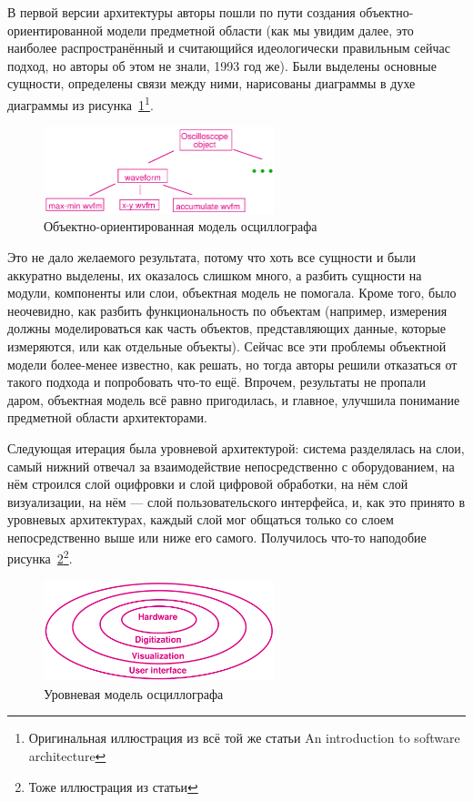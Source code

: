 \documentclass[a5paper]{article}
\begin{document}
В первой версии архитектуры авторы пошли по пути создания объектно-ориентированной модели предметной области (как мы увидим далее, это наиболее распространённый и считающийся идеологически правильным сейчас подход, но авторы об этом не знали, 1993 год же). Были выделены основные сущности, определены связи между ними, нарисованы диаграммы в духе диаграммы из рисунка~\ref{figure:oscilloscopeObjects}\footnote{Оригинальная иллюстрация из всё той же статьи An introduction to software architecture}.

\begin{figure}
	\begin{center}
		\includegraphics[width=0.6\textwidth]{oscilloscopeObjects.png}
	\end{center}
	\caption{Объектно-ориентированная модель осциллографа}
	\label{figure:oscilloscopeObjects}
\end{figure}

Это не дало желаемого результата, потому что хоть все сущности и были аккуратно выделены, их оказалось слишком много, а  разбить сущности на модули, компоненты или слои, объектная модель не помогала. Кроме того, было неочевидно, как разбить функциональность по объектам (например, измерения должны моделироваться как часть объектов, представляющих данные, которые измеряются, или как отдельные объекты). Сейчас все эти проблемы объектной модели более-менее известно, как решать, но тогда авторы решили отказаться от такого подхода и попробовать что-то ещё. Впрочем, результаты не пропали даром, объектная модель всё равно пригодилась, и главное, улучшила понимание предметной области архитекторами.

Следующая итерация была уровневой архитектурой: система разделялась на слои, самый нижний отвечал за взаимодействие непосредственно с оборудованием, на нём строился слой оцифровки и слой цифровой обработки, на нём слой визуализации, на нём --- слой пользовательского интерфейса, и, как это принято в уровневых архитектурах, каждый слой мог общаться только со слоем непосредственно выше или ниже его самого. Получилось что-то наподобие рисунка~\ref{figure:oscilloscopeLayers}\footnote{Тоже иллюстрация из статьи}.

\begin{figure}
	\begin{center}
		\includegraphics[width=0.6\textwidth]{oscilloscopeLayers.png}
	\end{center}
	\caption{Уровневая модель осциллографа}
	\label{figure:oscilloscopeLayers}
\end{figure}
\end{document}
